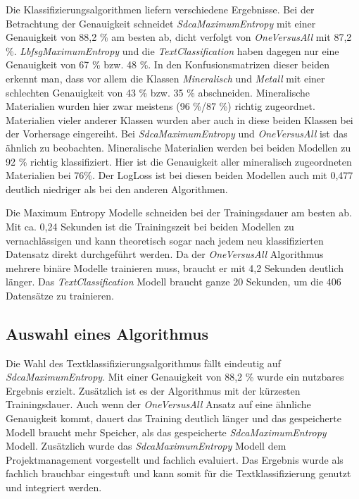 Die Klassifizierungsalgorithmen liefern verschiedene Ergebnisse. Bei der Betrachtung der Genauigkeit schneidet \textit{SdcaMaximumEntropy} mit einer Genauigkeit von 88,2 \% am besten ab, dicht verfolgt von \textit{OneVersusAll} mit 87,2 \%. \textit{LbfsgMaximumEntropy} und die \textit{TextClassification} haben dagegen nur eine Genauigkeit von 67 \% bzw. 48 \%. In den Konfusionsmatrizen dieser beiden erkennt man, dass vor allem die Klassen \textit{Mineralisch} und \textit{Metall} mit einer schlechten Genauigkeit von 43 \% bzw. 35 \% abschneiden. Mineralische Materialien wurden hier zwar meistens (96 \%/87 \%) richtig zugeordnet.  Materialien vieler anderer Klassen wurden aber auch in diese beiden Klassen bei der Vorhersage eingereiht. Bei \textit{SdcaMaximumEntropy} und \textit{OneVersusAll} ist das ähnlich zu beobachten. Mineralische Materialien werden bei beiden Modellen zu 92 \% richtig klassifiziert. Hier ist die Genauigkeit aller mineralisch zugeordneten Materialien bei 76\%. Der LogLoss ist bei diesen beiden Modellen auch mit 0,477 deutlich niedriger als bei den anderen Algorithmen.

Die Maximum Entropy Modelle schneiden bei der Trainingsdauer am besten ab. Mit ca. 0,24 Sekunden ist die Trainingszeit bei beiden Modellen zu vernachlässigen und kann theoretisch sogar nach jedem neu klassifizierten Datensatz direkt durchgeführt werden. Da der \textit{OneVersusAll} Algorithmus mehrere binäre Modelle trainieren muss, braucht er mit 4,2 Sekunden deutlich länger. Das \textit{TextClassification} Modell braucht ganze 20 Sekunden, um die 406 Datensätze zu trainieren.

\subsection{Auswahl eines Algorithmus}
\label{c:comparison:classification:selection}
Die Wahl des Textklassifizierungsalgorithmus fällt eindeutig auf \textit{SdcaMaximumEntropy}. Mit einer Genauigkeit von 88,2 \% wurde ein nutzbares Ergebnis erzielt. Zusätzlich ist es der Algorithmus mit der kürzesten Trainingsdauer. Auch wenn der \textit{OneVersusAll} Ansatz auf eine ähnliche Genauigkeit kommt, dauert das Training deutlich länger und das gespeicherte Modell braucht mehr Speicher, als das gespeicherte \textit{SdcaMaximumEntropy} Modell. 
Zusätzlich wurde das \textit{SdcaMaximumEntropy} Modell dem Projektmanagement vorgestellt und fachlich evaluiert. Das Ergebnis wurde als fachlich brauchbar eingestuft und kann somit für die Textklassifizierung genutzt und integriert werden.


